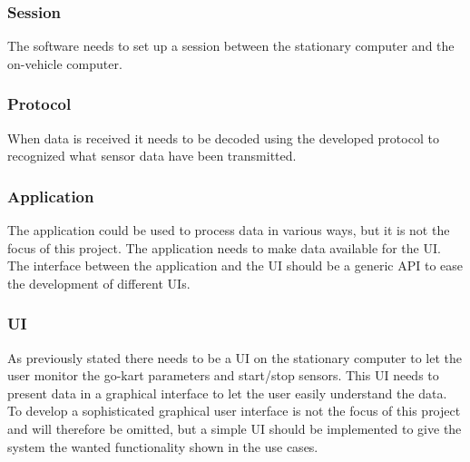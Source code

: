 \subsubsection*{Session}
The software needs to set up a session between the stationary computer and the on-vehicle computer.

\subsubsection*{Protocol}
When data is received it needs to be decoded using the developed protocol to recognized what sensor data have been transmitted.


\subsubsection*{Application}
The application could be used to process data in various ways, but it is not the focus of this project.
The application needs to make data available for the UI.
The interface between the application and the UI should be a generic API to ease the development of different UIs. 

\subsubsection*{UI}
As previously stated there needs to be a UI on the stationary computer to let the user monitor the go-kart parameters and start/stop sensors. 
This UI needs to present data in a graphical interface to let the user easily understand the data. 
To develop a sophisticated graphical user interface is not the focus of this project and will therefore be omitted, but a simple UI should be implemented to give the system the wanted functionality shown in the use cases.


